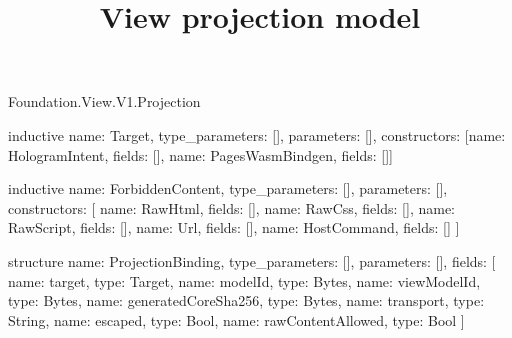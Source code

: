 \begin{lexlean}{Foundation.View.V1.Projection}
\title{View projection model}
\begin{semanticmodule}
inductive{
  name: Target,
  type_parameters: [],
  parameters: [],
  constructors: [{name: HologramIntent, fields: []}, {name: PagesWasmBindgen, fields: []}]
}

inductive{
  name: ForbiddenContent,
  type_parameters: [],
  parameters: [],
  constructors: [
    {name: RawHtml, fields: []},
    {name: RawCss, fields: []},
    {name: RawScript, fields: []},
    {name: Url, fields: []},
    {name: HostCommand, fields: []}
  ]
}

structure{
  name: ProjectionBinding,
  type_parameters: [],
  parameters: [],
  fields: [
    {name: target, type: Target},
    {name: modelId, type: Bytes},
    {name: viewModelId, type: Bytes},
    {name: generatedCoreSha256, type: Bytes},
    {name: transport, type: String},
    {name: escaped, type: Bool},
    {name: rawContentAllowed, type: Bool}
  ]
}
\end{semanticmodule}
\end{lexlean}
